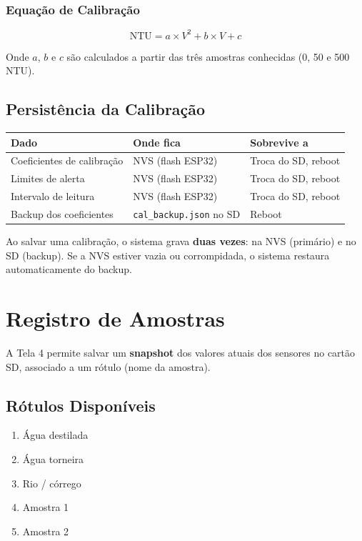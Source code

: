 \documentclass[12pt,a4paper]{article}
\begin{document}
\subsubsection{Equação de Calibração}

\begin{equation}
  \text{NTU} = a \times V^2 + b \times V + c
  \label{eq:ntu}
\end{equation}

Onde $a$, $b$ e $c$ são calculados a partir das três amostras conhecidas (0, 50 e 500\,NTU).

\subsection{Persistência da Calibração}

\begin{tabularx}{\textwidth}{l l X}
\toprule
\textbf{Dado} & \textbf{Onde fica} & \textbf{Sobrevive a} \\
\midrule
Coeficientes de calibração & NVS (flash ESP32) & Troca do SD, reboot \\
Limites de alerta & NVS (flash ESP32) & Troca do SD, reboot \\
Intervalo de leitura & NVS (flash ESP32) & Troca do SD, reboot \\
Backup dos coeficientes & \texttt{cal\_backup.json} no SD & Reboot \\
\bottomrule
\end{tabularx}

Ao salvar uma calibração, o sistema grava \textbf{duas vezes}: na NVS (primário) e no SD (backup). Se a NVS estiver vazia ou corrompidada, o sistema restaura automaticamente do backup.

\section{Registro de Amostras}

A Tela 4 permite salvar um \textbf{snapshot} dos valores atuais dos sensores no cartão SD, associado a um rótulo (nome da amostra).

\subsection{Rótulos Disponíveis}

\begin{enumerate}[nosep]
  \item Água destilada
  \item Água torneira
  \item Rio / córrego
  \item Amostra 1
  \item Amostra 2
\end{enumerate}
\end{document}
